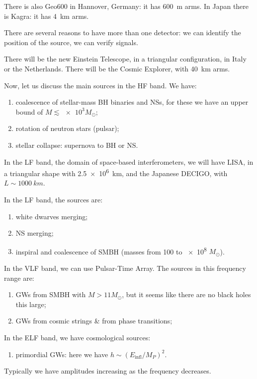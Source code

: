 \documentclass[main.tex]{subfiles}
\begin{document}
There is also Geo600 in Hannover, Germany: it has \SI{600}{m} arms. In Japan there is Kagra: it has \SI{4}{km} arms.

There are several reasons to have more than one detector: we can identify the position of the source, we can verify signals.

There will be the new Einstein Telescope, in a triangular configuration, in Italy or the Netherlands. 
There will be the Cosmic Explorer, with \SI{40}{km} arms. 

Now, let us discuss the main sources in the HF band. 
We have: 
\begin{enumerate}
  \item coalescence of stellar-mass BH binaries and NSs, for these we have an upper bound of \(M \lesssim \num{e3}M_{\odot} \);
  \item rotation of neutron stars (pulsar);
  \item stellar collapse: supernova to BH or NS.
\end{enumerate}

In the LF band, the domain of space-based interferometers, we will have LISA, in a triangular shape with \SI{2.5e6}{km}, and the Japanese DECIGO, with \(L \sim \SI{1000}{km}\). 

In the LF band, the sources are: 
\begin{enumerate}
  \item white dwarves merging;
  \item NS merging;
  \item inspiral and coalescence of SMBH (masses from 100 to \num{e8} \(M_{\odot}\)). 
\end{enumerate}

In the VLF band, we can use Pulsar-Time Array. The sources in this frequency range are:
\begin{enumerate}
  \item GWs from SMBH with \(M > \num{11} M_{\odot}\), but it seems like there are no black holes this large;
  \item GWs from cosmic strings \& from phase transitions;
\end{enumerate}

In the ELF band, we have cosmological sources: 
\begin{enumerate}
  \item primordial GWs: here we have \(h \sim (E _{\text{infl}} / M_P)^2\). 
\end{enumerate}

Typically we have amplitudes increasing as the frequency decreases. 
\end{document}
